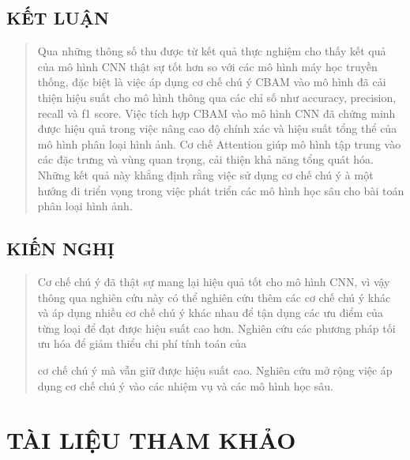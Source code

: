 \documentclass[
]{article}
\begin{document}
\hypertarget{kux1ebft-luux1eadn}{%
\subsection{KẾT LUẬN}\label{kux1ebft-luux1eadn}}

\begin{quote}
Qua những thông số thu được từ kết quả thực nghiệm cho thấy kết quả của
mô hình CNN thật sự tốt hơn so với các mô hình máy học truyền thống, đặc
biệt là việc áp dụng cơ chế chú ý CBAM vào mô hình đã cải thiện hiệu
suất cho mô hình thông qua các chỉ số như accuracy, precision, recall và
f1 score. Việc tích hợp CBAM vào mô hình CNN đã chứng minh được hiệu quả
trong việc nâng cao độ chính xác và hiệu suất tổng thể của mô hình phân
loại hình ảnh. Cơ chế Attention giúp mô hình tập trung vào các đặc trưng
và vùng quan trọng, cải thiện khả năng tổng quát hóa. Những kết quả này
khẳng định rằng việc sử dụng cơ chế chú ý à một hướng đi triển vọng
trong việc phát triển các mô hình học sâu cho bài toán phân loại hình
ảnh.
\end{quote}

\hypertarget{kiux1ebfn-nghux1ecb}{%
\subsection{KIẾN NGHỊ}\label{kiux1ebfn-nghux1ecb}}

\begin{quote}
Cơ chế chú ý đã thật sự mang lại hiệu quả tốt cho mô hình CNN, vì vậy
thông qua nghiên cứu này có thể nghiên cứu thêm các cơ chế chú ý khác và
áp dụng nhiều cơ chế chú ý khác nhau để tận dụng các ưu điểm của từng
loại để đạt được hiệu suất cao hơn. Nghiên cứu các phương pháp tối ưu
hóa để giảm thiểu chi phí tính toán của

cơ chế chú ý mà vẫn giữ được hiệu suất cao. Nghiên cứu mở rộng việc áp
dụng cơ chế chú ý vào các nhiệm vụ và các mô hình học sâu.
\end{quote}

\hypertarget{tuxe0i-liux1ec7u-tham-khux1ea3o}{%
\section{TÀI LIỆU THAM KHẢO}\label{tuxe0i-liux1ec7u-tham-khux1ea3o}}
\end{document}
